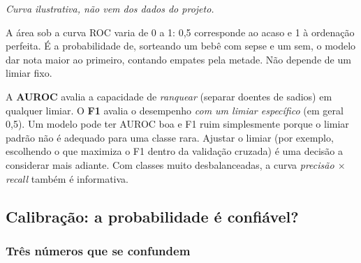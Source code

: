 \documentclass[11pt,a4paper]{article}
\begin{document}
\begin{center}

{\small\emph{Curva ilustrativa, não vem dos dados do projeto.}}
\end{center}

\begin{conceito}[AUROC]
A área sob a curva ROC varia de 0 a 1: 0,5 corresponde ao acaso e 1 à ordenação perfeita. É a probabilidade de, sorteando um bebê com sepse e um sem,
o modelo dar nota maior ao primeiro, contando empates pela metade. Não depende de um limiar fixo.
\end{conceito}

\begin{atencao}
A \textbf{AUROC} avalia a capacidade de \emph{ranquear} (separar doentes de sadios) em qualquer limiar. O \textbf{F1} avalia o desempenho
\emph{com um limiar específico} (em geral 0,5). Um modelo pode ter AUROC boa e F1 ruim simplesmente porque o limiar padrão não é adequado para uma
classe rara. Ajustar o limiar (por exemplo, escolhendo o que maximiza o F1 dentro da validação cruzada) é uma decisão a considerar mais adiante.
Com classes muito desbalanceadas, a curva \emph{precisão $\times$ recall} também é informativa.
\end{atencao}

\subsection{Calibração: a probabilidade é confiável?}
\label{sec:calibracao}

\subsubsection*{Três números que se confundem}
\end{document}
